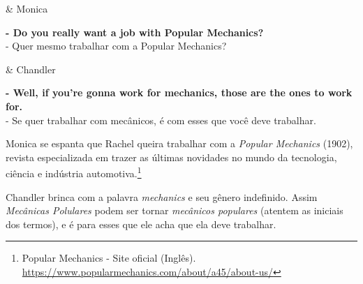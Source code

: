 \begin{tcolorbox}[enhanced,center upper,
    drop fuzzy shadow southeast, boxrule=0.3pt,
    lower separated=false, breakable,
    colframe=black!30!dialogoBorder,colback=white]
\begin{minipage}[c]{0.16\linewidth}
   & \centering \scriptsize{Monica}
\end{minipage}
\hfill
\begin{minipage}[c]{0.8\linewidth}
  \textbf{- Do you really want a job with Popular Mechanics?}\\
  - Quer mesmo trabalhar com a Popular Mechanics?
\end{minipage}

\medskip
\begin{minipage}[c]{0.16\linewidth}
   & \centering \scriptsize{Chandler}
\end{minipage}
\hfill
\begin{minipage}[c]{0.8\linewidth}
  \textbf{- Well, if you're gonna work for mechanics, those are the ones to work for.}\\
  - Se quer trabalhar com mecânicos, é com esses que você deve trabalhar.
\end{minipage}
\end{tcolorbox}

Monica se espanta que Rachel queira trabalhar com a \emph{Popular
Mechanics} (1902), revista especializada em trazer as últimas novidades
no mundo da tecnologia, ciência e indústria automotiva.\footnote{\sloppy Popular Mechanics - Site oficial (Inglês). \url{https://www.popularmechanics.com/about/a45/about-us/}}

Chandler brinca com a palavra \emph{mechanics} e seu gênero indefinido.
Assim \emph{Mecânicas Polulares} podem ser tornar \emph{mecânicos
populares} (atentem as iniciais dos termos), e é para esses que ele acha
que ela deve trabalhar.

